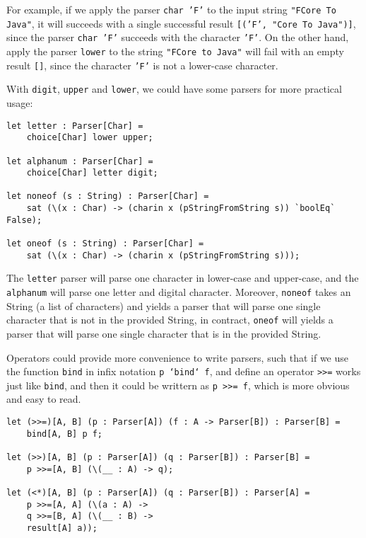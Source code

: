 For example, if we apply the parser \texttt{char 'F'} to the input string \texttt{"FCore To Java"}, it will succeeds with a single successful result \texttt{[('F', "Core To Java")]}, since the parser \texttt{char 'F'} succeeds with the character \texttt{'F'}. On the other hand, apply the parser \texttt{lower} to the string \texttt{"FCore to Java"} will fail with an empty result \texttt{[]}, since the character \texttt{'F'} is not a lower-case character.

With \texttt{digit}, \texttt{upper} and \texttt{lower}, we could have some parsers for more practical usage:

\begin{lstlisting}
let letter : Parser[Char] =
    choice[Char] lower upper;

let alphanum : Parser[Char] =
    choice[Char] letter digit;

let noneof (s : String) : Parser[Char] =
    sat (\(x : Char) -> (charin x (pStringFromString s)) `boolEq` False);

let oneof (s : String) : Parser[Char] =
    sat (\(x : Char) -> (charin x (pStringFromString s)));
\end{lstlisting}

The \texttt{letter} parser will parse one character in lower-case and upper-case, and the \texttt{alphanum} will parse one letter and digital character. Moreover, \texttt{noneof} takes an String (a list of characters) and yields a parser that will parse one single character that is not in the provided String, in contract, \texttt{oneof} will yields a parser that will parse one single character that is in the provided String.

Operators could provide more convenience to write parsers, such that if we use the function \texttt{bind} in infix notation \texttt{p `bind` f}, and define an operator \texttt{>>=} works just like \texttt{bind}, and then it could be writtern as \texttt{p >>= f}, which is more obvious and easy to read.

\begin{lstlisting}
let (>>=)[A, B] (p : Parser[A]) (f : A -> Parser[B]) : Parser[B] =
    bind[A, B] p f;

let (>>)[A, B] (p : Parser[A]) (q : Parser[B]) : Parser[B] =
    p >>=[A, B] (\(__ : A) -> q);

let (<*)[A, B] (p : Parser[A]) (q : Parser[B]) : Parser[A] =
    p >>=[A, A] (\(a : A) ->
    q >>=[B, A] (\(__ : B) ->
    result[A] a));
\end{lstlisting}

